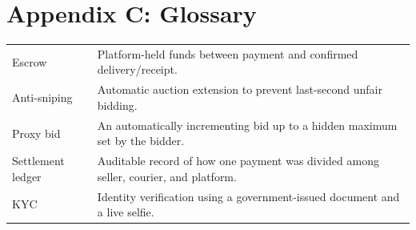 \documentclass[11pt,a4paper]{report}
\newenvironment{deftable}{\begin{longtable}{p{3.5cm}p{10.2cm}}}{\end{longtable}}
\begin{document}
\section{Appendix C: Glossary}
\begin{deftable}
Escrow & Platform-held funds between payment and confirmed delivery/receipt. \\
Anti-sniping & Automatic auction extension to prevent last-second unfair bidding. \\
Proxy bid & An automatically incrementing bid up to a hidden maximum set by the bidder. \\
Settlement ledger & Auditable record of how one payment was divided among seller, courier, and platform. \\
KYC & Identity verification using a government-issued document and a live selfie. \\
\end{deftable}
\end{document}
